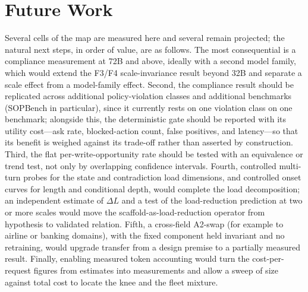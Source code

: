 \section{Future Work}\label{sec:future}
Several cells of the map are measured here and several remain projected; the natural next steps, in order of value, are as follows. The most consequential is a compliance measurement at 72B and above, ideally with a second model family, which would extend the F3/F4 scale-invariance result beyond 32B and separate a scale effect from a model-family effect. Second, the compliance result should be replicated across additional policy-violation classes and additional benchmarks (SOPBench in particular), since it currently rests on one violation class on one benchmark; alongside this, the deterministic gate should be reported with its utility cost---ask rate, blocked-action count, false positives, and latency---so that its benefit is weighed against its trade-off rather than asserted by construction. Third, the flat per-write-opportunity rate should be tested with an equivalence or trend test, not only by overlapping confidence intervals. Fourth, controlled multi-turn probes for the state and contradiction load dimensions, and controlled onset curves for length and conditional depth, would complete the load decomposition; an independent estimate of $\Delta L$ and a test of the load-reduction prediction at two or more scales would move the scaffold-as-load-reduction operator from hypothesis to validated relation. Fifth, a cross-field A2-swap (for example to airline or banking domains), with the fixed component held invariant and no retraining, would upgrade transfer from a design premise to a partially measured result. Finally, enabling measured token accounting would turn the cost-per-request figures from estimates into measurements and allow a sweep of size against total cost to locate the knee and the fleet mixture.
